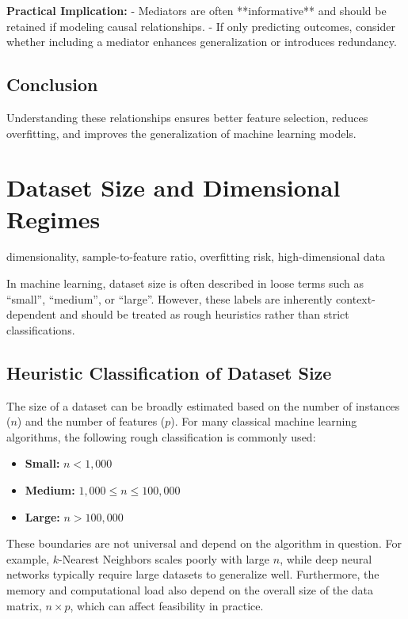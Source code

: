 \documentclass[12pt,openany]{book}
\begin{document}
\textbf{Practical Implication:}
- Mediators are often **informative** and should be retained if modeling causal relationships.
- If only predicting outcomes, consider whether including a mediator enhances generalization or introduces redundancy.

\subsection{Conclusion}

Understanding these relationships ensures better feature selection, reduces overfitting, and improves the generalization of machine learning models.



\section{Dataset Size and Dimensional Regimes}

\begin{keywordsbox}
dimensionality, sample-to-feature ratio, overfitting risk, high-dimensional data
\end{keywordsbox}


In machine learning, dataset size is often described in loose terms such as ``small'', ``medium'', or ``large''. However, these labels are inherently context-dependent and should be treated as rough heuristics rather than strict classifications.

\subsection{Heuristic Classification of Dataset Size}

The size of a dataset can be broadly estimated based on the number of instances (\(n\)) and the number of features (\(p\)). For many classical machine learning algorithms, the following rough classification is commonly used:

\begin{itemize}
    \item \textbf{Small:} \(n < 1{,}000\)
    \item \textbf{Medium:} \(1{,}000 \leq n \leq 100{,}000\)
    \item \textbf{Large:} \(n > 100{,}000\)
\end{itemize}

These boundaries are not universal and depend on the algorithm in question. For example, \(k\)-Nearest Neighbors scales poorly with large \(n\), while deep neural networks typically require large datasets to generalize well. Furthermore, the memory and computational load also depend on the overall size of the data matrix, \(n \times p\), which can affect feasibility in practice.
\end{document}
